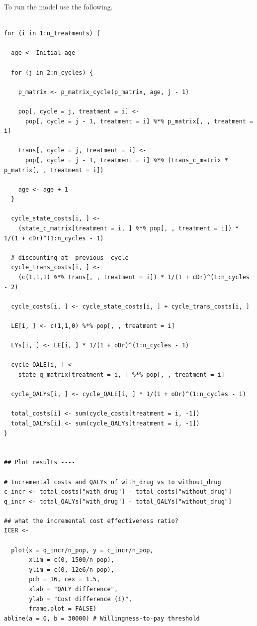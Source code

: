 \documentclass[a4paper,twoside,openany]{../svmonoBUGS}\usepackage[]{graphicx}\usepackage[]{color}
\begin{document}
To run the model use the following.

\begin{verbatim}

for (i in 1:n_treatments) {
  
  age <- Initial_age
  
  for (j in 2:n_cycles) {
    
    p_matrix <- p_matrix_cycle(p_matrix, age, j - 1)
    
    pop[, cycle = j, treatment = i] <-
      pop[, cycle = j - 1, treatment = i] %*% p_matrix[, , treatment = i]
    
    trans[, cycle = j, treatment = i] <-
      pop[, cycle = j - 1, treatment = i] %*% (trans_c_matrix * p_matrix[, , treatment = i])
    
    age <- age + 1
  }
  
  cycle_state_costs[i, ] <-
    (state_c_matrix[treatment = i, ] %*% pop[, , treatment = i]) * 1/(1 + cDr)^(1:n_cycles - 1)
  
  # discounting at _previous_ cycle
  cycle_trans_costs[i, ] <-
    (c(1,1,1) %*% trans[, , treatment = i]) * 1/(1 + cDr)^(1:n_cycles - 2)
  
  cycle_costs[i, ] <- cycle_state_costs[i, ] + cycle_trans_costs[i, ]
  
  LE[i, ] <- c(1,1,0) %*% pop[, , treatment = i]
  
  LYs[i, ] <- LE[i, ] * 1/(1 + oDr)^(1:n_cycles - 1)
  
  cycle_QALE[i, ] <-
    state_q_matrix[treatment = i, ] %*% pop[, , treatment = i]
  
  cycle_QALYs[i, ] <- cycle_QALE[i, ] * 1/(1 + oDr)^(1:n_cycles - 1)
  
  total_costs[i] <- sum(cycle_costs[treatment = i, -1])
  total_QALYs[i] <- sum(cycle_QALYs[treatment = i, -1])
}


## Plot results ----

# Incremental costs and QALYs of with_drug vs to without_drug
c_incr <- total_costs["with_drug"] - total_costs["without_drug"]
q_incr <- total_QALYs["with_drug"] - total_QALYs["without_drug"]

## what the incremental cost effectiveness ratio?
ICER <- 
  
  plot(x = q_incr/n_pop, y = c_incr/n_pop,
       xlim = c(0, 1500/n_pop),
       ylim = c(0, 12e6/n_pop),
       pch = 16, cex = 1.5,
       xlab = "QALY difference",
       ylab = "Cost difference (£)",
       frame.plot = FALSE)
abline(a = 0, b = 30000) # Willingness-to-pay threshold
\end{verbatim}
\end{document}
